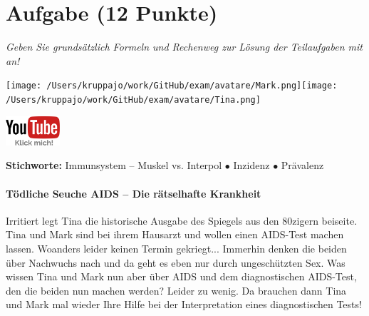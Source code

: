 \documentclass[a4paper, 9pt]{scrartcl}\usepackage[]{graphicx}\usepackage[]{xcolor}
\begin{document}
 
\clearpage

\section{Aufgabe \hfill (12 Punkte)}

\textit{Geben Sie grundsätzlich Formeln und Rechenweg zur Lösung der Teilaufgaben mit an!} \\[1Ex]
 

 
\begin{minipage}[t]{0.5\textwidth}
\texttt{[image: /Users/kruppajo/work/GitHub/exam/avatare/Mark.png]}\hspace{-4mm}\texttt{[image: /Users/kruppajo/work/GitHub/exam/avatare/Tina.png]}
\end{minipage}
\begin{minipage}[t]{0.5\textwidth}
\hfill
\href{https://youtu.be/flRBo1FWQy0}{\includegraphics[width = 2cm]{img/youtube}}
\end{minipage}

{\tiny\textbf{Stichworte:} Immunsystem -- Muskel vs. Interpol $\bullet$ Inzidenz $\bullet$ Prävalenz}




\paragraph{Tödliche Seuche AIDS -- Die rätselhafte Krankheit}




Irritiert legt Tina die historische Ausgabe des Spiegels aus den 80zigern beiseite. Tina und Mark sind bei ihrem Hausarzt und wollen einen AIDS-Test machen lassen. Woanders leider keinen Termin gekriegt... Immerhin denken die beiden über Nachwuchs nach und da geht es eben nur durch ungeschützten Sex. Was wissen Tina und Mark nun aber über AIDS und dem diagnostischen AIDS-Test, den die beiden nun machen werden? Leider zu wenig. Da brauchen dann Tina und Mark mal wieder Ihre Hilfe bei der Interpretation eines diagnostischen Tests!\\
\end{document}
